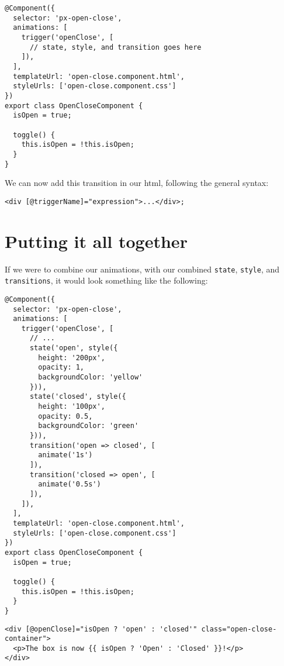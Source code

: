 \begin{lstlisting}[caption=open-close.component.ts]
@Component({
  selector: 'px-open-close',
  animations: [
    trigger('openClose', [
      // state, style, and transition goes here
    ]),
  ],
  templateUrl: 'open-close.component.html',
  styleUrls: ['open-close.component.css']
})
export class OpenCloseComponent {
  isOpen = true;

  toggle() {
    this.isOpen = !this.isOpen;
  }
}
\end{lstlisting}

We can now add this transition in our html, following the general syntax: 
\begin{lstlisting}[caption=*.html]
<div [@triggerName]="expression">...</div>;
\end{lstlisting}

\section{ Putting it all together }
If we were to combine our animations, with our combined \lstinline{state}, 
\lstinline{style}, and \lstinline{transitions}, it would look something like 
the following:
\begin{lstlisting}[caption=open-close.component.ts]
@Component({
  selector: 'px-open-close',
  animations: [
    trigger('openClose', [
      // ...
      state('open', style({
        height: '200px',
        opacity: 1,
        backgroundColor: 'yellow'
      })),
      state('closed', style({
        height: '100px',
        opacity: 0.5,
        backgroundColor: 'green'
      })),
      transition('open => closed', [
        animate('1s')
      ]),
      transition('closed => open', [
        animate('0.5s')
      ]),
    ]),
  ],
  templateUrl: 'open-close.component.html',
  styleUrls: ['open-close.component.css']
})
export class OpenCloseComponent {
  isOpen = true;

  toggle() {
    this.isOpen = !this.isOpen;
  }
}
\end{lstlisting}

\begin{lstlisting}[caption=open-close.component.html]
<div [@openClose]="isOpen ? 'open' : 'closed'" class="open-close-container">
  <p>The box is now {{ isOpen ? 'Open' : 'Closed' }}!</p>
</div>
\end{lstlisting}
